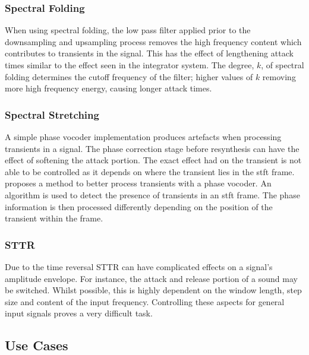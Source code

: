 		\subsubsection*{Spectral Folding}
			When using spectral folding, the low pass filter applied prior to the downsampling and upsampling
			process removes the high frequency content which contributes to transients in the signal. This has
			the effect of lengthening attack times similar to the effect seen in the integrator system. The
			degree, $k$, of spectral folding determines the cutoff frequency of the filter; higher values of
			$k$ removing more high frequency energy, causing longer attack times.

		\subsubsection*{Spectral Stretching}
			A simple phase vocoder implementation produces artefacts when processing transients in a signal.
			The phase correction stage before resynthesis can have the effect of softening the attack portion.
			The exact effect had on the transient is not able to be controlled as it depends on where the
			transient lies in the \acrshort{stft} frame. \citet{robel2003a} proposes a method to better process
			transients with a phase vocoder. An algorithm is used to detect the presence of transients in an
			\acrshort{stft} frame.  The phase information is then processed differently depending on the
			position of the transient within the frame.

		\subsubsection*{STTR}
			Due to the time reversal STTR can have complicated effects on a signal's amplitude envelope.  For
			instance, the attack and release portion of a sound may be switched. Whilst possible, this is
			highly dependent on the window length, step size and content of the input frequency. Controlling
			these aspects for general input signals proves a very difficult task.

	\subsection{Use Cases}
	\label{sec:ExcitationEvaluation-Comparison-UseCases}
